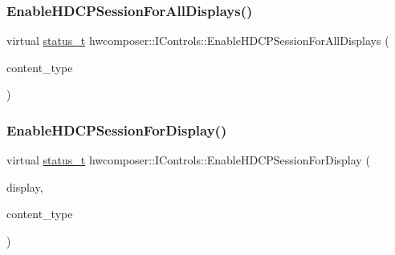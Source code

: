 \subsubsection{\texorpdfstring{Enable\+H\+D\+C\+P\+Session\+For\+All\+Displays()}{EnableHDCPSessionForAllDisplays()}}
{\footnotesize\ttfamily virtual \mbox{\hyperlink{hwcserviceapi_8h_a3806fb2027d9a316d8ca8d9b8b8eb96f}{status\+\_\+t}} hwcomposer\+::\+I\+Controls\+::\+Enable\+H\+D\+C\+P\+Session\+For\+All\+Displays (\begin{DoxyParamCaption}\item[{\mbox{\hyperlink{hwcserviceapi_8h_a69e9b3a54e4c8e504845398c66eab655}{E\+Hwcs\+Content\+Type}}}]{content\+\_\+type }\end{DoxyParamCaption})\hspace{0.3cm}{\ttfamily [pure virtual]}}

\mbox{\label{classhwcomposer_1_1IControls_a99550456802b4989806ac630f65db636}} 
\subsubsection{\texorpdfstring{Enable\+H\+D\+C\+P\+Session\+For\+Display()}{EnableHDCPSessionForDisplay()}}
{\footnotesize\ttfamily virtual \mbox{\hyperlink{hwcserviceapi_8h_a3806fb2027d9a316d8ca8d9b8b8eb96f}{status\+\_\+t}} hwcomposer\+::\+I\+Controls\+::\+Enable\+H\+D\+C\+P\+Session\+For\+Display (\begin{DoxyParamCaption}\item[{uint32\+\_\+t}]{display,  }\item[{\mbox{\hyperlink{hwcserviceapi_8h_a69e9b3a54e4c8e504845398c66eab655}{E\+Hwcs\+Content\+Type}}}]{content\+\_\+type }\end{DoxyParamCaption})\hspace{0.3cm}{\ttfamily [pure virtual]}}

\mbox{\label{classhwcomposer_1_1IControls_a762f814efdb6c21fdc156a5a19014a0e}} 

